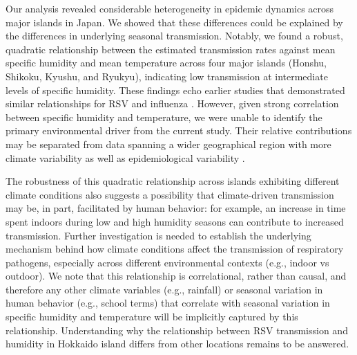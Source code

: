 \documentclass[12pt]{article}
\begin{document}
Our analysis revealed considerable heterogeneity in epidemic dynamics across major islands in Japan.
We showed that these differences could be explained by the differences in underlying seasonal transmission.
Notably, we found a robust, quadratic relationship between the estimated transmission rates against mean specific humidity and mean temperature across four major islands (Honshu, Shikoku, Kyushu, and Ryukyu), indicating low transmission at intermediate levels of specific humidity.
These findings echo earlier studies that demonstrated similar relationships for RSV \citep{baker2019epidemic} and influenza \citep{lowen2007influenza,shaman2009absolute,shaman2010absolute,tamerius2013environmental,lowen2014roles}.
However, given strong correlation between specific humidity and temperature, we were unable to identify the primary environmental driver from the current study.
Their relative contributions may be separated from data spanning a wider geographical region with more climate variability as well as epidemiological variability \citep{baker2019epidemic}.

The robustness of this quadratic relationship across islands exhibiting different climate conditions also suggests a possibility that climate-driven transmission may be, in part, facilitated by human behavior: for example, an increase in time spent indoors during low and high humidity seasons can contribute to increased transmission.
Further investigation is needed to establish the underlying mechanism behind how climate conditions affect the transmission of respiratory pathogens, especially across different environmental contexts (e.g., indoor vs outdoor).
We note that this relationship is correlational, rather than causal, and therefore any other climate variables (e.g., rainfall) or seasonal variation in human behavior (e.g., school terms) that correlate with seasonal variation in specific humidity and temperature will be implicitly captured by this relationship.
Understanding why the relationship between RSV transmission and humidity in Hokkaido island differs from other locations remains to be answered.
\end{document}
